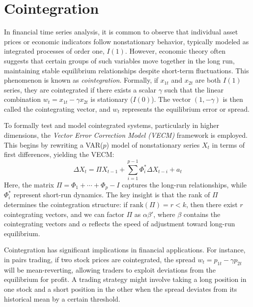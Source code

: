 \section{Cointegration}

In financial time series analysis, it is common to observe that individual asset prices or economic indicators follow nonstationary behavior, typically modeled as integrated processes of order one, \( I(1) \). However, economic theory often suggests that certain groups of such variables move together in the long run, maintaining stable equilibrium relationships despite short-term fluctuations. This phenomenon is known as \textit{cointegration}. Formally, if \( x_{1t} \) and \( x_{2t} \) are both \( I(1) \) series, they are cointegrated if there exists a scalar \( \gamma \) such that the linear combination \( w_t = x_{1t} - \gamma x_{2t} \) is stationary (\( I(0) \)). The vector \( (1, -\gamma) \) is then called the cointegrating vector, and \( w_t \) represents the equilibrium error or spread.

To formally test and model cointegrated systems, particularly in higher dimensions, the \textit{Vector Error Correction Model (VECM)} framework is employed. This begins by rewriting a VAR(\(p\)) model of nonstationary series \( X_t \) in terms of first differences, yielding the VECM:
\begin{equation}
	\Delta X_t = \Pi X_{t-1} + \sum_{i=1}^{p-1} \Phi_i^* \Delta X_{t-i} + a_t
\end{equation}
Here, the matrix \( \Pi = \Phi_1 + \cdots + \Phi_p - I \) captures the long-run relationships, while \( \Phi_i^* \) represent short-run dynamics. The key insight is that the rank of \( \Pi \) determines the cointegration structure: if \( \text{rank}(\Pi) = r < k \), then there exist \( r \) cointegrating vectors, and we can factor \( \Pi \) as \( \alpha \beta' \), where \( \beta \) contains the cointegrating vectors and \( \alpha \) reflects the speed of adjustment toward long-run equilibrium.



Cointegration has significant implications in financial applications. For instance, in pairs trading, if two stock prices are cointegrated, the spread \( w_t = p_{1t} - \gamma p_{2t} \) will be mean-reverting, allowing traders to exploit deviations from the equilibrium for profit. A trading strategy might involve taking a long position in one stock and a short position in the other when the spread deviates from its historical mean by a certain threshold. 


